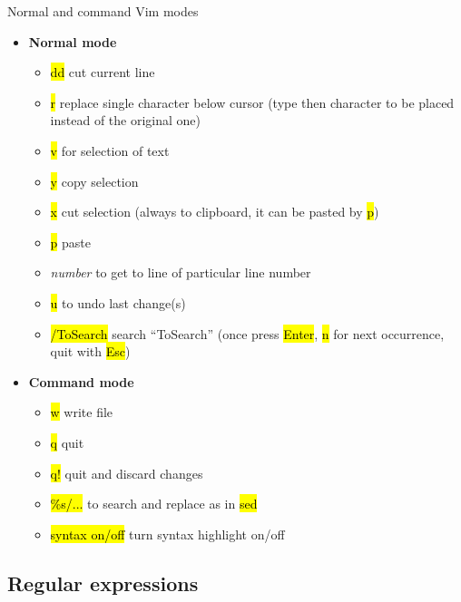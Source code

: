 \documentclass[compress, ucs, xelatex, 11pt, xcolor=svgnames,
  hyperref={
    bookmarks=true,
    unicode=true,
    colorlinks=true,
    pdftitle={Linux, command line and MetaCentrum},
    plainpages=false,
    pdfauthor={Vojtech Zeisek},
    pdfsubject={Course about use of Linux command line, writing shell scripts and using MetaCentrum of CESNET},
    pdfcreator={XeLaTeX},
    pdfkeywords={Linux, GNU, BASH, shell, command line, MetaCentrum},
    linkcolor=DarkRed,
    anchorcolor=DarkBlue,
    citecolor=Indigo,
    filecolor=NavyBlue,
    menucolor=DarkMagenta,
    urlcolor=DarkBlue,
    pdftex},
  url={hyphens, lowtilde} %
  ]{beamer}
\renewcommand{\texttt}[1]{\hl{\ttfamily #1}}
\begin{document}
\begin{frame}{Normal and command Vim modes}
  \begin{multicols}{2}
    \begin{itemize}
      \item \textbf{Normal mode}
      \begin{itemize}
	\item \texttt{dd} cut current line
	\item \texttt{r} replace single character below cursor (type then character to be placed instead of the original one)
	\item \texttt{v} for selection of text
	\item \texttt{y} copy selection
	\item \texttt{x} cut selection (always to clipboard, it can be pasted by \texttt{p})
	\item \texttt{p} paste
	\item \textit{number} to get to line of particular line number
	\item \texttt{u} to undo last change(s)
	\item \texttt{/ToSearch} search ``ToSearch'' (once press \texttt{Enter}, \texttt{n} for next occurrence, quit with \texttt{Esc})
      \end{itemize}
      \item \textbf{Command mode}
      \begin{itemize}
	\item \texttt{w} write file
	\item \texttt{q} quit
	\item \texttt{q!} quit and discard changes
	\item \texttt{\%s/...} to search and replace as in \texttt{sed}
	\item \texttt{syntax on/off} turn syntax highlight on/off
      \end{itemize}
    \end{itemize}
  \end{multicols}
\end{frame}

\subsection{Regular expressions}
\end{document}
